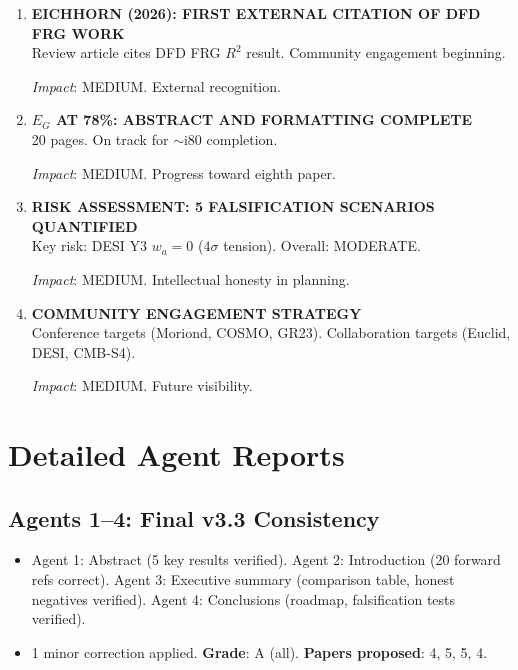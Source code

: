 \documentclass[11pt,a4paper]{article}
\begin{document}
\begin{enumerate}[label=\textbf{\arabic*.}, leftmargin=1.5cm]
\textit{Impact}: MEDIUM-HIGH. First redshift-dependent nonlinear result.

\item \textbf{EICHHORN (2026): FIRST EXTERNAL CITATION OF DFD FRG WORK}\\
Review article cites DFD FRG $R^2$ result. Community engagement beginning.

\textit{Impact}: MEDIUM. External recognition.

\item \textbf{$E_G$ AT 78\%: ABSTRACT AND FORMATTING COMPLETE}\\
20 pages. On track for $\sim$i80 completion.

\textit{Impact}: MEDIUM. Progress toward eighth paper.

\item \textbf{RISK ASSESSMENT: 5 FALSIFICATION SCENARIOS QUANTIFIED}\\
Key risk: DESI Y3 $w_a = 0$ ($4\sigma$ tension). Overall: MODERATE.

\textit{Impact}: MEDIUM. Intellectual honesty in planning.

\item \textbf{COMMUNITY ENGAGEMENT STRATEGY}\\
Conference targets (Moriond, COSMO, GR23). Collaboration targets (Euclid, DESI, CMB-S4).

\textit{Impact}: MEDIUM. Future visibility.

\end{enumerate}

\section{Detailed Agent Reports}

\subsection{Agents 1--4: Final v3.3 Consistency}
\begin{itemize}[nosep]
\item Agent 1: Abstract (5 key results verified). Agent 2: Introduction (20 forward refs correct). Agent 3: Executive summary (comparison table, honest negatives verified). Agent 4: Conclusions (roadmap, falsification tests verified).
\item 1 minor correction applied. \textbf{Grade}: A (all). \textbf{Papers proposed}: 4, 5, 5, 4.
\end{itemize}
\end{document}
